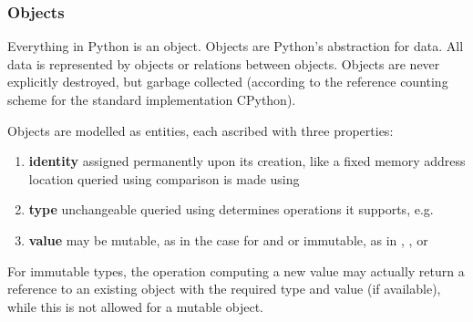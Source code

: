 \documentclass{icldt}
\numberwithin{equation}{section}       %
\begin{document}
{\subsubsection{Objects}
Everything in Python is an object. Objects are Python's abstraction for data. All data is represented by objects or relations between objects. Objects are never explicitly destroyed, but garbage collected (according to the reference counting scheme for the standard implementation \textsf{CPython}).

Objects are modelled as entities, each ascribed with three properties:

\begin{enumerate}
	\item \textbf{identity}
		\subitem assigned permanently upon its creation, like a fixed memory address location
		\subitem queried using 
		\subitem comparison is made using 
	\item \textbf{type}
		\subitem unchangeable
		\subitem queried using 
		\subitem determines operations it supports, e.g. 
	\item \textbf{value}
		\subitem may be mutable, as in the case for  and 
		\subitem or immutable, as in , , or 
\end{enumerate}

For immutable types, the operation computing a new value may actually return a reference to an existing object with the required type and value (if available), while this is not allowed for a mutable object.

}
\end{document}
